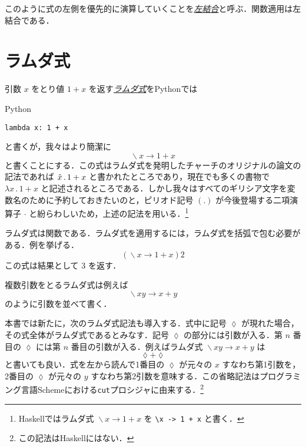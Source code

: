 \documentclass[a4paper,draft]{jsbook}
\newcommand{\programminglanguage}[1]{\textsf{#1}}
\newcommand{\haskell}{\programminglanguage{Haskell}}
\newcommand{\python}{\programminglanguage{Python}}
\newcommand{\scheme}{\programminglanguage{Scheme}}
\newcommand{\keyword}[1]{{\underline{\emph{#1}}}}
\newcommand{\code}[1]{\texttt{#1}}
\newenvironment{pythoncode}{\begin{itembox}[r]{\python}}{\end{itembox}}
\newcommand{\mAnonParameter}{\lozenge}
\DeclareMathOperator{\mLambda}{\backslash}
\DeclareMathOperator{\mLambdaArrow}{\rightarrow}
\DeclareMathOperator{\mApplyRight}{\twoheadrightarrow}
\newcommand{\mLambdaExp}[2]{\mLambda{#1}\mLambdaArrow{#2}}
\begin{document}
このように式の左側を優先的に演算していくことを\keyword{左結合}と呼ぶ．関数適用は左結合である．



\section{ラムダ式}

引数 $x$ をとり値 $1+x$ を返す\keyword{ラムダ式}を\python では
\begin{pythoncode}
\begin{verbatim}
lambda x: 1 + x
\end{verbatim}
\end{pythoncode}
と書くが，我々はより簡潔に
\begin{equation}
\mLambdaExp{x}{1+x}
\end{equation}
と書くことにする．この式はラムダ式を発明したチャーチのオリジナルの論文の記法であれば $\Hat{x}\,.\,1+x$ と書かれたところであり，現在でも多くの書物で $\lambda x\,.\,1+x$ と記述されるところである．しかし我々はすべてのギリシア文字を変数名のために予約しておきたいのと，ピリオド記号 $(.)$ が今後登場する二項演算子 $\cdot$ と紛らわしいため，上述の記法を用いる．\footnote{\haskell ではラムダ式 $\mLambdaExp{x}{1+x}$ を \code{\textbackslash x -> 1 + x} と書く．}

ラムダ式は関数である．ラムダ式を適用するには，ラムダ式を括弧で包む必要がある．例を挙げる．
\begin{equation}
(\mLambdaExp{x}{1+x})2
\end{equation}
この式は結果として $3$ を返す．

複数引数をとるラムダ式は例えば
\begin{equation}
\mLambdaExp{xy}{x+y}
\end{equation}
のように引数を並べて書く．

本書では新たに，次のラムダ式記法も導入する．式中に記号 $\mAnonParameter$ が現れた場合，その式全体がラムダ式であるとみなす．記号 $\mAnonParameter$ の部分には引数が入る．第 $n$ 番目の $\mAnonParameter$ には第 $n$ 番目の引数が入る．例えばラムダ式 $\mLambdaExp{xy}{x+y}$ は
\begin{equation}
\mAnonParameter+\mAnonParameter
\end{equation}
と書いても良い．式を左から読んで1番目の $\mAnonParameter$ が元々の $x$ すなわち第1引数を，2番目の $\mAnonParameter$ が元々の $y$ すなわち第2引数を意味する．この省略記法はプログラミング言語\scheme における\code{cut}プロシジャに由来する．\footnote{この記法は\haskell にはない．}
\end{document}
